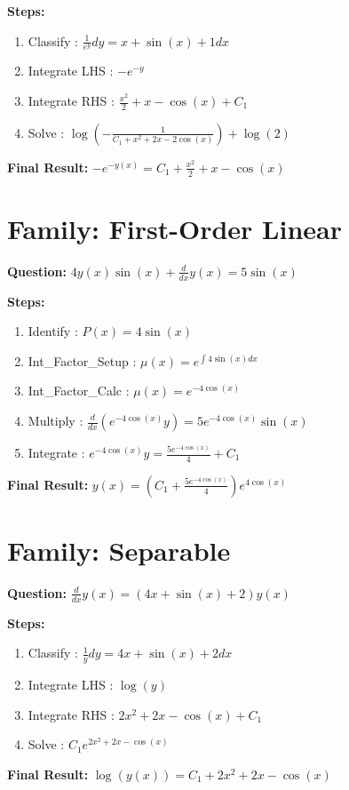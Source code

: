 \documentclass{article}
\begin{document}
\textbf{Steps:}
\begin{enumerate}
\item Classify :  $\frac{1}{e^{y}} dy = x + \sin{\left(x \right)} + 1 dx$
\item Integrate LHS :  $- e^{- y}$
\item Integrate RHS :  $\frac{x^{2}}{2} + x - \cos{\left(x \right)} + C_1$
\item Solve :  $\log{\left(- \frac{1}{C_{1} + x^{2} + 2 x - 2 \cos{\left(x \right)}} \right)} + \log{\left(2 \right)}$
\end{enumerate}
\textbf{Final Result:} $- e^{- y{\left(x \right)}} = C_{1} + \frac{x^{2}}{2} + x - \cos{\left(x \right)}$

\section*{Family: First-Order Linear}
\textbf{Question:} $4 y{\left(x \right)} \sin{\left(x \right)} + \frac{d}{d x} y{\left(x \right)} = 5 \sin{\left(x \right)}$

\textbf{Steps:}
\begin{enumerate}
\item Identify :  $P(x) = 4 \sin{\left(x \right)}$
\item Int_Factor_Setup :  $\mu(x) = e^{\int 4 \sin{\left(x \right)} dx}$
\item Int_Factor_Calc :  $\mu(x) = e^{- 4 \cos{\left(x \right)}}$
\item Multiply :  $\frac{d}{dx}(e^{- 4 \cos{\left(x \right)}}y) = 5 e^{- 4 \cos{\left(x \right)}} \sin{\left(x \right)}$
\item Integrate :  $e^{- 4 \cos{\left(x \right)}}y = \frac{5 e^{- 4 \cos{\left(x \right)}}}{4} + C_1$
\end{enumerate}
\textbf{Final Result:} $y{\left(x \right)} = \left(C_{1} + \frac{5 e^{- 4 \cos{\left(x \right)}}}{4}\right) e^{4 \cos{\left(x \right)}}$

\section*{Family: Separable}
\textbf{Question:} $\frac{d}{d x} y{\left(x \right)} = \left(4 x + \sin{\left(x \right)} + 2\right) y{\left(x \right)}$

\textbf{Steps:}
\begin{enumerate}
\item Classify :  $\frac{1}{y} dy = 4 x + \sin{\left(x \right)} + 2 dx$
\item Integrate LHS :  $\log{\left(y \right)}$
\item Integrate RHS :  $2 x^{2} + 2 x - \cos{\left(x \right)} + C_1$
\item Solve :  $C_{1} e^{2 x^{2} + 2 x - \cos{\left(x \right)}}$
\end{enumerate}
\textbf{Final Result:} $\log{\left(y{\left(x \right)} \right)} = C_{1} + 2 x^{2} + 2 x - \cos{\left(x \right)}$
\end{document}

